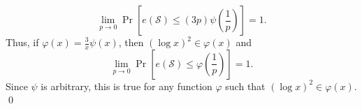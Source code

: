 \[\lim_{p \to 0}\Pr\left[e(\mathcal{S}) \leq (3p)\psi\left(\frac{1}{p}\right)\right] = 1.\]
Thus, if $\varphi(x) =\frac{3}{x} \psi\left(x\right)$, then $(\log x)^2 \in \varphi(x)$ and 
\[\lim_{p \to 0}\Pr\left[e(\mathcal{S}) \leq \varphi\left(\frac{1}{p}\right)\right] = 1.\]
Since $\psi$ is arbitrary, this is true for any function $\varphi$ such that $(\log x)^2 \in \varphi(x)$. \qed \par
